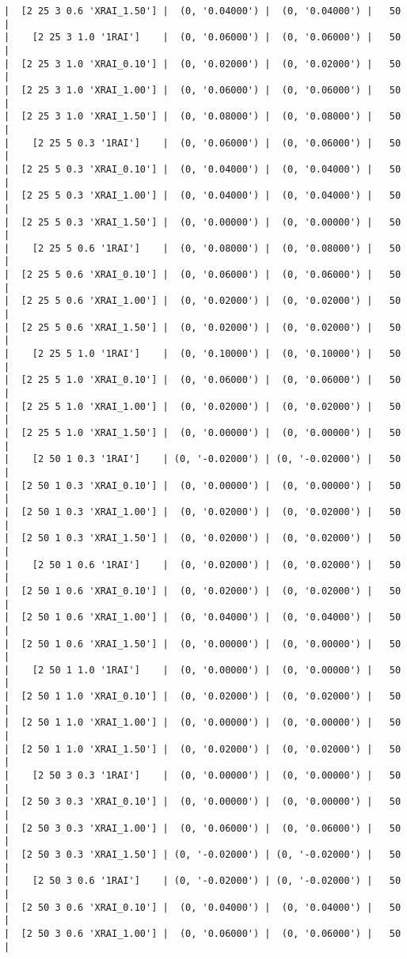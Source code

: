 \documentclass{article}
\begin{document}
\begin{verbatim}
|  [2 25 3 0.6 'XRAI_1.50'] |  (0, '0.04000') |  (0, '0.04000') |   50  |
|    [2 25 3 1.0 '1RAI']    |  (0, '0.06000') |  (0, '0.06000') |   50  |
|  [2 25 3 1.0 'XRAI_0.10'] |  (0, '0.02000') |  (0, '0.02000') |   50  |
|  [2 25 3 1.0 'XRAI_1.00'] |  (0, '0.06000') |  (0, '0.06000') |   50  |
|  [2 25 3 1.0 'XRAI_1.50'] |  (0, '0.08000') |  (0, '0.08000') |   50  |
|    [2 25 5 0.3 '1RAI']    |  (0, '0.06000') |  (0, '0.06000') |   50  |
|  [2 25 5 0.3 'XRAI_0.10'] |  (0, '0.04000') |  (0, '0.04000') |   50  |
|  [2 25 5 0.3 'XRAI_1.00'] |  (0, '0.04000') |  (0, '0.04000') |   50  |
|  [2 25 5 0.3 'XRAI_1.50'] |  (0, '0.00000') |  (0, '0.00000') |   50  |
|    [2 25 5 0.6 '1RAI']    |  (0, '0.08000') |  (0, '0.08000') |   50  |
|  [2 25 5 0.6 'XRAI_0.10'] |  (0, '0.06000') |  (0, '0.06000') |   50  |
|  [2 25 5 0.6 'XRAI_1.00'] |  (0, '0.02000') |  (0, '0.02000') |   50  |
|  [2 25 5 0.6 'XRAI_1.50'] |  (0, '0.02000') |  (0, '0.02000') |   50  |
|    [2 25 5 1.0 '1RAI']    |  (0, '0.10000') |  (0, '0.10000') |   50  |
|  [2 25 5 1.0 'XRAI_0.10'] |  (0, '0.06000') |  (0, '0.06000') |   50  |
|  [2 25 5 1.0 'XRAI_1.00'] |  (0, '0.02000') |  (0, '0.02000') |   50  |
|  [2 25 5 1.0 'XRAI_1.50'] |  (0, '0.00000') |  (0, '0.00000') |   50  |
|    [2 50 1 0.3 '1RAI']    | (0, '-0.02000') | (0, '-0.02000') |   50  |
|  [2 50 1 0.3 'XRAI_0.10'] |  (0, '0.00000') |  (0, '0.00000') |   50  |
|  [2 50 1 0.3 'XRAI_1.00'] |  (0, '0.02000') |  (0, '0.02000') |   50  |
|  [2 50 1 0.3 'XRAI_1.50'] |  (0, '0.02000') |  (0, '0.02000') |   50  |
|    [2 50 1 0.6 '1RAI']    |  (0, '0.02000') |  (0, '0.02000') |   50  |
|  [2 50 1 0.6 'XRAI_0.10'] |  (0, '0.02000') |  (0, '0.02000') |   50  |
|  [2 50 1 0.6 'XRAI_1.00'] |  (0, '0.04000') |  (0, '0.04000') |   50  |
|  [2 50 1 0.6 'XRAI_1.50'] |  (0, '0.00000') |  (0, '0.00000') |   50  |
|    [2 50 1 1.0 '1RAI']    |  (0, '0.00000') |  (0, '0.00000') |   50  |
|  [2 50 1 1.0 'XRAI_0.10'] |  (0, '0.02000') |  (0, '0.02000') |   50  |
|  [2 50 1 1.0 'XRAI_1.00'] |  (0, '0.00000') |  (0, '0.00000') |   50  |
|  [2 50 1 1.0 'XRAI_1.50'] |  (0, '0.02000') |  (0, '0.02000') |   50  |
|    [2 50 3 0.3 '1RAI']    |  (0, '0.00000') |  (0, '0.00000') |   50  |
|  [2 50 3 0.3 'XRAI_0.10'] |  (0, '0.00000') |  (0, '0.00000') |   50  |
|  [2 50 3 0.3 'XRAI_1.00'] |  (0, '0.06000') |  (0, '0.06000') |   50  |
|  [2 50 3 0.3 'XRAI_1.50'] | (0, '-0.02000') | (0, '-0.02000') |   50  |
|    [2 50 3 0.6 '1RAI']    | (0, '-0.02000') | (0, '-0.02000') |   50  |
|  [2 50 3 0.6 'XRAI_0.10'] |  (0, '0.04000') |  (0, '0.04000') |   50  |
|  [2 50 3 0.6 'XRAI_1.00'] |  (0, '0.06000') |  (0, '0.06000') |   50  |

\end{verbatim}
\end{document}
